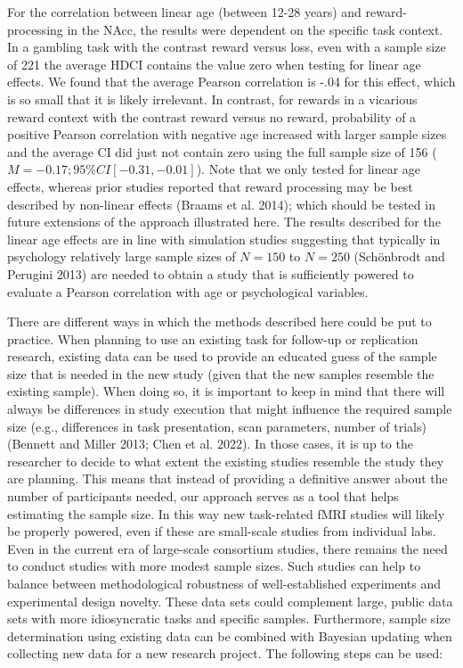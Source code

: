 \documentclass[
  letterpaper,
  DIV=11,
  numbers=noendperiod]{scrartcl}
\begin{document}
For the correlation between linear age (between 12-28 years) and
reward-processing in the NAcc, the results were dependent on the
specific task context. In a gambling task with the contrast reward
versus loss, even with a sample size of 221 the average HDCI contains
the value zero when testing for linear age effects. We found that the
average Pearson correlation is -.04 for this effect, which is so small
that it is likely irrelevant. In contrast, for rewards in a vicarious
reward context with the contrast reward versus no reward, probability of
a positive Pearson correlation with negative age increased with larger
sample sizes and the average CI did just not contain zero using the full
sample size of 156 (\(M = -0.17; 95\% CI [-0.31, -0.01]\)). Note that we
only tested for linear age effects, whereas prior studies reported that
reward processing may be best described by non-linear effects (Braams et
al. 2014); which should be tested in future extensions of the approach
illustrated here. The results described for the linear age effects are
in line with simulation studies suggesting that typically in psychology
relatively large sample sizes of \(N=150\) to \(N=250\) (Schönbrodt and
Perugini 2013) are needed to obtain a study that is sufficiently powered
to evaluate a Pearson correlation with age or psychological variables.

There are different ways in which the methods described here could be
put to practice. When planning to use an existing task for follow-up or
replication research, existing data can be used to provide an educated
guess of the sample size that is needed in the new study (given that the
new samples resemble the existing sample). When doing so, it is
important to keep in mind that there will always be differences in study
execution that might influence the required sample size (e.g.,
differences in task presentation, scan parameters, number of trials)
(Bennett and Miller 2013; Chen et al. 2022). In those cases, it is up to
the researcher to decide to what extent the existing studies resemble
the study they are planning. This means that instead of providing a
definitive answer about the number of participants needed, our approach
serves as a tool that helps estimating the sample size. In this way new
task-related fMRI studies will likely be properly powered, even if these
are small-scale studies from individual labs. Even in the current era of
large-scale consortium studies, there remains the need to conduct
studies with more modest sample sizes. Such studies can help to balance
between methodological robustness of well-established experiments and
experimental design novelty. These data sets could complement large,
public data sets with more idiosyncratic tasks and specific samples.
Furthermore, sample size determination using existing data can be
combined with Bayesian updating when collecting new data for a new
research project. The following steps can be used:
\end{document}
